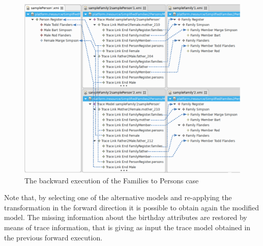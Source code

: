 \begin{figure}[h]
	\center
	\includegraphics[width=.5\textwidth]{diagrams/solutions/jtl_bw}
	\caption{The backward execution of the Families to Persons case}
	\label{fig:jtl_bw}
\end{figure}


Note that, by selecting one of the alternative models and re-applying the transformation in the forward direction it is possible to obtain again the modified model. The missing information about the birthday attributes are restored by means of trace information, that is giving as input the trace model obtained in the previous forward execution. 